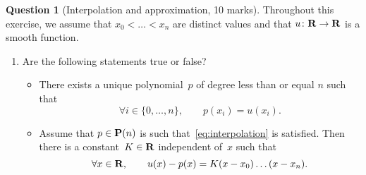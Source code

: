 \documentclass[11pt]{article}
\theoremstyle{definition}
\newtheorem{question}{Question}
\begin{document}
\newpage
\begin{question}
    [Interpolation and approximation, 10 marks]
    Throughout this exercise, we assume
    that $x_0 < \dotsc < x_n$ are distinct values and
    that $u \colon \mathbf R \to \mathbf R$ is a smooth function.

    \begin{enumerate}
        \item 
            Are the following statements true or false?
            \begin{itemize}
                \item
                    There exists a unique polynomial~$p$ of degree less than or equal $n$ such that
                    \begin{equation}
                        \label{eq:interpolation}
                        \forall i \in \{0, \dotsc, n\}, \qquad
                        p(x_i) = u (x_i).
                    \end{equation}

                \item
                    Assume that $p \in \mathbf P(n)$ is such that~\eqref{eq:interpolation} is satisfied.
                    Then there is a constant~$K \in \mathbf R$ independent of~$x$ such that
                    \[
                        \forall x \in \mathbf R,
                        \qquad u(x) - p(x) = K (x - x_0) \dotsc (x - x_n).
                    \]


\end{itemize}
\end{enumerate}
\end{question}
\end{document}
